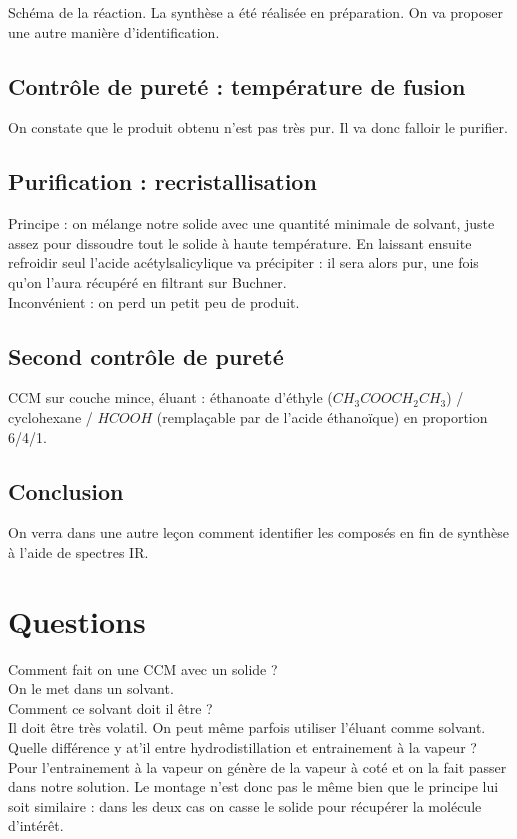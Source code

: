 \documentclass[12pt,prb,aps,epsf]{article}
\begin{document}
Schéma de la réaction. La synthèse a été réalisée en préparation. On va proposer une autre manière d'identification.

\subsection{Contrôle de pureté : température de fusion}
On constate que le produit obtenu n'est pas très pur. Il va donc falloir le purifier.

\subsection{Purification : recristallisation}
Principe : on mélange notre solide avec une quantité minimale de solvant, juste assez pour dissoudre tout le solide à haute température. En laissant ensuite refroidir seul l'acide acétylsalicylique va précipiter : il sera alors pur, une fois qu'on l'aura récupéré en filtrant sur Buchner.\\
Inconvénient : on perd un petit peu de produit.

\subsection{Second contrôle de pureté}
CCM sur couche mince, éluant : éthanoate d'éthyle ($CH_3COOCH_2CH_3$) / cyclohexane / $HCOOH$ (remplaçable par de l'acide éthanoïque) en proportion 6/4/1.

\subsection*{Conclusion}
On verra dans une autre leçon comment identifier les composés en fin de synthèse à l'aide de spectres IR.

\section*{Questions}
Comment fait on une CCM avec un solide ?\\
On le met dans un solvant.\\

Comment ce solvant doit il être ?\\
Il doit être très volatil. On peut même parfois utiliser l'éluant comme solvant.\\

Quelle différence y at'il entre hydrodistillation et entrainement à la vapeur ?\\
Pour l'entrainement à la vapeur on génère de la vapeur à coté et on la fait passer dans notre solution. Le montage n'est donc pas le même bien que le principe lui soit similaire : dans les deux cas on casse le solide pour récupérer la molécule d'intérêt.\\
\end{document}
